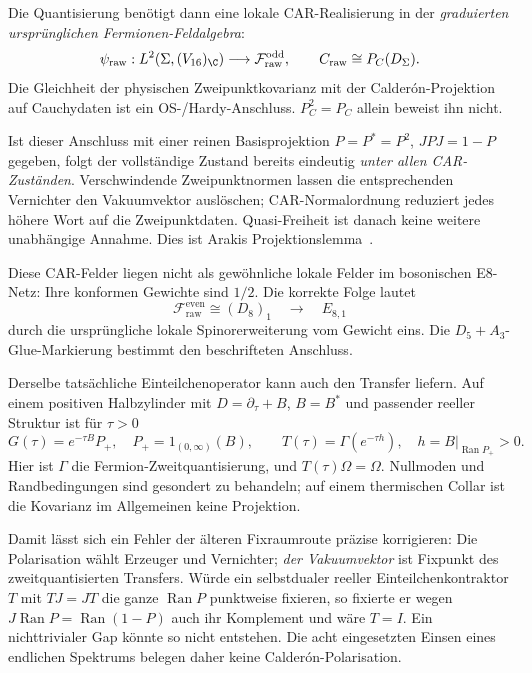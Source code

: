 Die Quantisierung benötigt dann eine lokale CAR-Realisierung in der \emph{graduierten ursprünglichen Fermionen-Feldalgebra}:
\begin{equation}
\psi_{\mathrm{raw}}:L^2(\Sigma,(V_{16})_{\C})
\longrightarrow\mathcal F_{\mathrm{raw}}^{\mathrm{odd}},
\qquad C_{\mathrm{raw}}\cong P_C(D_\Sigma).
\end{equation}
Die Gleichheit der physischen Zweipunktkovarianz mit der Calderón-Projektion auf Cauchydaten ist ein OS-/Hardy-Anschluss. $P_C^2=P_C$ allein beweist ihn nicht.

Ist dieser Anschluss mit einer reinen Basisprojektion $P=P^*=P^2$, $JPJ=1-P$ gegeben, folgt der vollständige Zustand bereits eindeutig \emph{unter allen CAR-Zuständen}. Verschwindende Zweipunktnormen lassen die entsprechenden Vernichter den Vakuumvektor auslöschen; CAR-Normalordnung reduziert jedes höhere Wort auf die Zweipunktdaten. Quasi-Freiheit ist danach keine weitere unabhängige Annahme. Dies ist Arakis Projektionslemma~\cite{arakicar}.

Diese CAR-Felder liegen nicht als gewöhnliche lokale Felder im bosonischen E8-Netz: Ihre konformen Gewichte sind $1/2$. Die korrekte Folge lautet
\begin{equation}
\mathcal F_{\mathrm{raw}}^{\mathrm{even}}\cong(D_8)_1
\quad\longrightarrow\quad E_{8,1}
\end{equation}
durch die ursprüngliche lokale Spinorerweiterung vom Gewicht eins. Die $D_5+A_3$-Glue-Markierung bestimmt den beschrifteten Anschluss.

Derselbe tatsächliche Einteilchenoperator kann auch den Transfer liefern. Auf einem positiven Halbzylinder mit $D=\partial_\tau+B$, $B=B^*$ und passender reeller Struktur ist für $\tau>0$
\begin{equation}
G(\tau)=e^{-\tau B}P_+,\quad P_+=1_{(0,\infty)}(B),\qquad
T(\tau)=\Gamma(e^{-\tau h}),\quad h=B|_{\operatorname{Ran}P_+}>0.
\end{equation}
Hier ist $\Gamma$ die Fermion-Zweitquantisierung, und $T(\tau)\Omega=\Omega$. Nullmoden und Randbedingungen sind gesondert zu behandeln; auf einem thermischen Collar ist die Kovarianz im Allgemeinen keine Projektion.

Damit lässt sich ein Fehler der älteren Fixraumroute präzise korrigieren: Die Polarisation wählt Erzeuger und Vernichter; \emph{der Vakuumvektor} ist Fixpunkt des zweitquantisierten Transfers. Würde ein selbstdualer reeller Einteilchenkontraktor $T$ mit $TJ=JT$ die ganze $\operatorname{Ran}P$ punktweise fixieren, so fixierte er wegen $J\operatorname{Ran}P=\operatorname{Ran}(1-P)$ auch ihr Komplement und wäre $T=I$. Ein nichttrivialer Gap könnte so nicht entstehen. Die acht eingesetzten Einsen eines endlichen Spektrums belegen daher keine Calderón-Polarisation.

